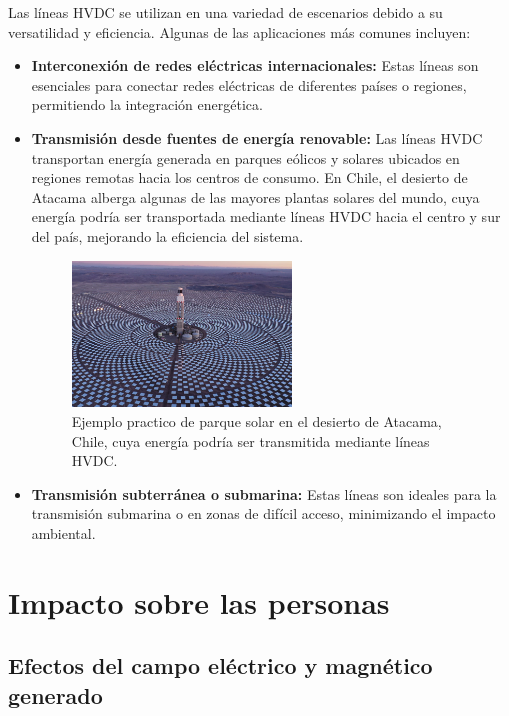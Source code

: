 Las líneas HVDC se utilizan en una variedad de escenarios debido a su versatilidad y eficiencia. Algunas de las aplicaciones más comunes incluyen:
	\begin{itemize}
		\item \textbf{Interconexión de redes eléctricas internacionales:} 
		Estas líneas son esenciales para conectar redes eléctricas de diferentes países o regiones, permitiendo la integración energética.
	
		\item \textbf{Transmisión desde fuentes de energía renovable:} 
		Las líneas HVDC transportan energía generada en parques eólicos y solares ubicados en regiones remotas hacia los centros de consumo. En Chile, el desierto de Atacama alberga algunas de las mayores plantas solares del mundo, cuya energía podría ser transportada mediante líneas HVDC hacia el centro y sur del país, mejorando la eficiencia del sistema.
		\begin{figure}
			\centering
			\includegraphics[width=0.55\textwidth]{img/ejemplos/Figure_4}
			\caption{Ejemplo practico de parque solar en el desierto de Atacama, Chile, cuya energía podría ser transmitida mediante líneas HVDC.}
			\label{fig:figure_4}
		\end{figure}
	
		\item \textbf{Transmisión subterránea o submarina:} 
		Estas líneas son ideales para la transmisión submarina o en zonas de difícil acceso, minimizando el impacto ambiental.
	\end{itemize}


\newpage
\section{Impacto sobre las personas}

\subsection{Efectos del campo eléctrico y magnético generado}

